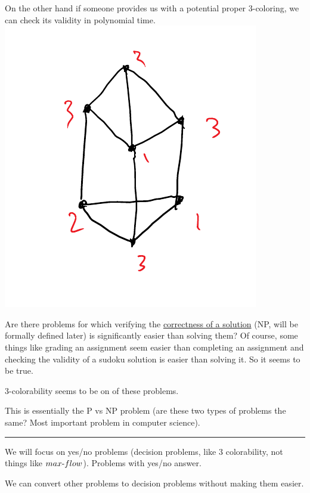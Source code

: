 \documentclass[12 pt]{article}
\begin{document}
          On the other hand if someone provides us with a potential
          proper 3-coloring, we can check its validity in polynomial
          time.
          \\ \includegraphics[width=.9\textwidth]{i114.pdf}

          Are there problems for which verifying the
          \underline{correctness of a solution} (NP, will be formally
          defined later) is significantly easier than solving them? Of
          course, some things like grading an assignment seem easier
          than completing an assignment and checking the validity of a
          sudoku solution is easier than solving it. So it seems to be
          true.

          3-colorability seems to be on of these problems.

          This is essentially the P vs NP problem (are these two types
          of problems the same? Most important problem in computer
          science).
          \\ \noindent \rule{\textwidth}{0.5pt}
          We will focus on yes/no problems (decision problems, like 3
          colorability, not things like $max\hbox{-}flow$). Problems
          with yes/no answer.

          We can convert other problems to decision problems without
          making them easier.
\end{document}
